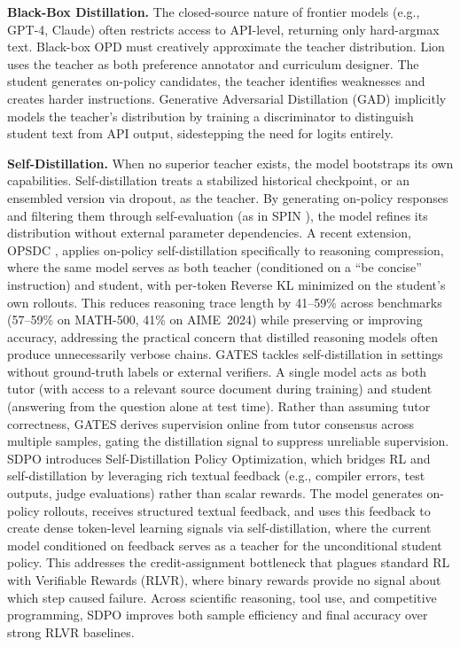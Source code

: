 \documentclass{article} %
\begin{document}
\textbf{Black-Box Distillation.} The closed-source nature of frontier models (e.g., GPT-4, Claude) often restricts access to API-level, returning only hard-argmax text. Black-box OPD must creatively approximate the teacher distribution. Lion \citep{2305.12870} uses the teacher as both preference annotator and curriculum designer. The student generates on-policy candidates, the teacher identifies weaknesses and creates harder instructions. Generative Adversarial Distillation (GAD) \citep{2511.10643} implicitly models the teacher's distribution by training a discriminator to distinguish student text from API output, sidestepping the need for logits entirely.

\textbf{Self-Distillation.} When no superior teacher exists, the model bootstraps its own capabilities. Self-distillation treats a stabilized historical checkpoint, or an ensembled version via dropout, as the teacher. By generating on-policy responses and filtering them through self-evaluation (as in SPIN \citep{2401.01335}), the model refines its distribution without external parameter dependencies.
A recent extension, OPSDC \citep{2603.05433}, applies on-policy self-distillation specifically to reasoning compression, where the same model serves as both teacher (conditioned on a ``be concise'' instruction) and student, with per-token Reverse KL minimized on the student's own rollouts. This reduces reasoning trace length by 41--59\% across benchmarks (57--59\% on MATH-500, 41\% on AIME~2024) while preserving or improving accuracy, addressing the practical concern that distilled reasoning models often produce unnecessarily verbose chains.
GATES \citep{2602.20574} tackles self-distillation in settings without ground-truth labels or external verifiers. A single model acts as both tutor (with access to a relevant source document during training) and student (answering from the question alone at test time). Rather than assuming tutor correctness, GATES derives supervision online from tutor consensus across multiple samples, gating the distillation signal to suppress unreliable supervision.
SDPO \citep{2601.20802} introduces Self-Distillation Policy Optimization, which bridges RL and self-distillation by leveraging rich textual feedback (e.g., compiler errors, test outputs, judge evaluations) rather than scalar rewards. The model generates on-policy rollouts, receives structured textual feedback, and uses this feedback to create dense token-level learning signals via self-distillation, where the current model conditioned on feedback serves as a teacher for the unconditional student policy. This addresses the credit-assignment bottleneck that plagues standard RL with Verifiable Rewards (RLVR), where binary rewards provide no signal about which step caused failure. Across scientific reasoning, tool use, and competitive programming, SDPO improves both sample efficiency and final accuracy over strong RLVR baselines.
\end{document}
